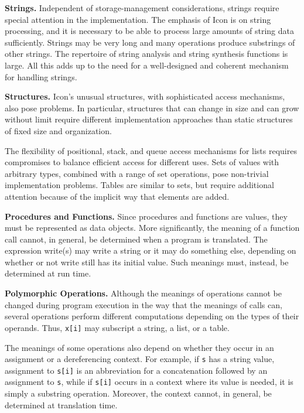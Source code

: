 \textbf{Strings.} Independent of storage-management considerations,
strings require special attention in the implementation. The emphasis
of Icon is on string processing, and it is necessary to be able to
process large amounts of string data sufficiently. Strings may be very
long and many operations produce substrings of other strings. The
repertoire of string analysis and string synthesis functions is
large. All this adds up to the need for a well-designed and coherent
mechanism for handling strings.


\textbf{Structures.} Icon's unusual structures, with sophisticated
access mechanisms, also pose problems. In particular, structures that
can change in size and can grow without limit require different
implementation approaches than static structures of fixed size and
organization.


The flexibility of positional, stack, and queue access mechanisms for
lists requires compromises to balance efficient access for different
uses. Sets of values with arbitrary types, combined with a range of
set operations, pose non-trivial implementation problems. Tables are
similar to sets, but require additional attention because of the
implicit way that elements are added.


\textbf{Procedures and Functions.} Since procedures and functions are
values, they must be represented as data objects.  More significantly,
the meaning of a function call cannot, in general, be determined when
a program is translated. The expression write(s) may write a string or
it may do something else, depending on whether or not write still has
its initial value. Such meanings must, instead, be determined at run
time.


\textbf{Polymorphic Operations.} Although the meanings of operations
cannot be changed during program execution in the way that the
meanings of calls can, several operations perform different
computations depending on the types of their operands. Thus,
\texttt{x[i]} may subscript a string, a list, or a table.

The meanings of some operations also depend on whether they occur in
an assignment or a dereferencing context. For example, if \texttt{s}
has a string value, assignment to \texttt{s[i]} is an abbreviation for
a concatenation followed by an assignment to \texttt{s}, while if
\texttt{s[i]} occurs in a context where its value is needed, it is
simply a substring operation. Moreover, the context cannot, in
general, be determined at translation time.

